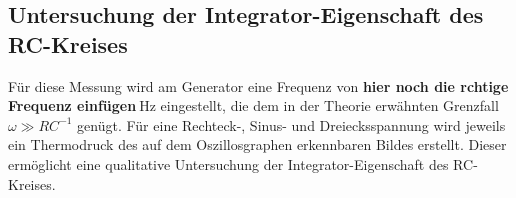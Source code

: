 \subsection{Untersuchung der Integrator-Eigenschaft des RC-Kreises}
Für diese Messung wird am Generator eine Frequenz von \textbf{hier noch die rchtige Frequenz einfügen}$\SI{}{\hertz}$ eingestellt, die dem in der Theorie erwähnten Grenzfall $\omega \gg RC^{-1}$ genügt. Für eine Rechteck-, Sinus- und Dreiecksspannung wird
jeweils ein Thermodruck des auf dem Oszillosgraphen erkennbaren Bildes erstellt. Dieser ermöglicht eine qualitative Untersuchung der
Integrator-Eigenschaft des RC-Kreises.
